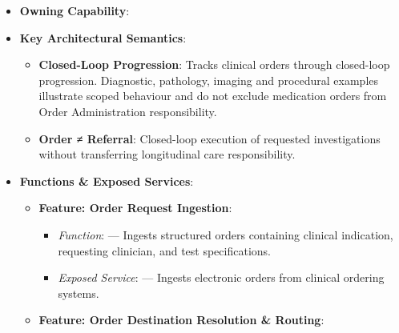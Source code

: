 \begin{itemize}

\item 
\textbf{Owning Capability}: \texttt{}



\item 
\textbf{Key Architectural Semantics}:


\begin{itemize}

\item 
\textbf{Closed-Loop Progression}: Tracks clinical orders through closed-loop progression. Diagnostic, pathology, imaging and procedural examples illustrate scoped behaviour and do not exclude medication orders from Order Administration responsibility.



\item 
\textbf{Order ≠ Referral}: Closed-loop execution of requested investigations without transferring longitudinal care responsibility.



\end{itemize}


\item 
\textbf{Functions \& Exposed Services}:


\begin{itemize}

\item 
\textbf{Feature: Order Request Ingestion}:


\begin{itemize}

\item 
\emph{Function}: \texttt{} — Ingests structured orders containing clinical indication, requesting clinician, and test specifications.



\item 
\emph{Exposed Service}: \texttt{} — Ingests electronic orders from clinical ordering systems.



\end{itemize}


\item 
\textbf{Feature: Order Destination Resolution \& Routing}:


\begin{itemize}


\end{itemize}
\end{itemize}
\end{itemize}
